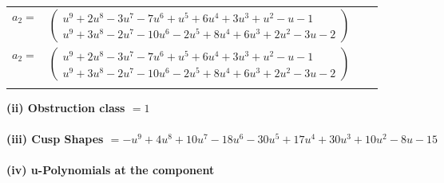 \documentclass[1p]{elsarticle_modified}
\theoremstyle{definition}
\begin{document}
\begin{tabular}{m{7pt} m{180pt} m{7pt} m{180pt} }
\flushright $a_{2}=$&$\begin{pmatrix}u^9+2 u^8-3 u^7-7 u^6+u^5+6 u^4+3 u^3+u^2- u-1\\u^9+3 u^8-2 u^7-10 u^6-2 u^5+8 u^4+6 u^3+2 u^2-3 u-2\end{pmatrix}$\\ \flushright $a_{2}=$&$\begin{pmatrix}u^9+2 u^8-3 u^7-7 u^6+u^5+6 u^4+3 u^3+u^2- u-1\\u^9+3 u^8-2 u^7-10 u^6-2 u^5+8 u^4+6 u^3+2 u^2-3 u-2\end{pmatrix}$\\&\end{tabular}
\flushleft \textbf{(ii) Obstruction class $= 1$}\\~\\
\flushleft \textbf{(iii) Cusp Shapes $= - u^9+4 u^8+10 u^7-18 u^6-30 u^5+17 u^4+30 u^3+10 u^2-8 u-15$}\\~\\
\newpage\renewcommand{\arraystretch}{1}
\flushleft \textbf{(iv) u-Polynomials at the component}\newline \\
\end{document}
